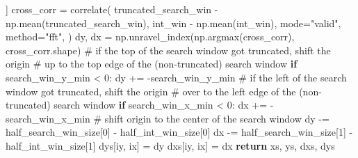 \documentclass[
  english,
  letterpaper,
  numbers=noendperiod,
  DIV=13]{scrreprt}
\newenvironment{Shaded}{\begin{snugshade}}{\end{snugshade}}
\newcommand{\CommentTok}[1]{\textcolor[rgb]{0.37,0.37,0.37}{#1}}
\newcommand{\ControlFlowTok}[1]{\textcolor[rgb]{0.00,0.23,0.31}{\textbf{#1}}}
\newcommand{\DecValTok}[1]{\textcolor[rgb]{0.68,0.00,0.00}{#1}}
\newcommand{\NormalTok}[1]{\textcolor[rgb]{0.00,0.23,0.31}{#1}}
\newcommand{\OperatorTok}[1]{\textcolor[rgb]{0.37,0.37,0.37}{#1}}
\newcommand{\StringTok}[1]{\textcolor[rgb]{0.13,0.47,0.30}{#1}}
\begin{document}
\begin{Shaded}
\begin{Highlighting}[]
\NormalTok{            ]}
\NormalTok{            cross\_corr }\OperatorTok{=}\NormalTok{ correlate(}
\NormalTok{                truncated\_search\_win }\OperatorTok{{-}}\NormalTok{ np.mean(truncated\_search\_win),}
\NormalTok{                int\_win }\OperatorTok{{-}}\NormalTok{ np.mean(int\_win),}
\NormalTok{                mode}\OperatorTok{=}\StringTok{"valid"}\NormalTok{,}
\NormalTok{                method}\OperatorTok{=}\StringTok{"fft"}\NormalTok{,}
\NormalTok{            )}
\NormalTok{            dy, dx }\OperatorTok{=}\NormalTok{ np.unravel\_index(np.argmax(cross\_corr), cross\_corr.shape)}
            \CommentTok{\# if the top of the search window got truncated, shift the origin}
            \CommentTok{\# up to the top edge of the (non{-}truncated) search window}
            \ControlFlowTok{if}\NormalTok{ search\_win\_y\_min }\OperatorTok{\textless{}} \DecValTok{0}\NormalTok{:}
\NormalTok{                dy }\OperatorTok{+=} \OperatorTok{{-}}\NormalTok{search\_win\_y\_min}
            \CommentTok{\# if the left of the search window got truncated, shift the origin}
            \CommentTok{\# over to the left edge of the (non{-}truncated) search window}
            \ControlFlowTok{if}\NormalTok{ search\_win\_x\_min }\OperatorTok{\textless{}} \DecValTok{0}\NormalTok{:}
\NormalTok{                dx }\OperatorTok{+=} \OperatorTok{{-}}\NormalTok{search\_win\_x\_min}
            \CommentTok{\# shift origin to the center of the search window}
\NormalTok{            dy }\OperatorTok{{-}=}\NormalTok{ half\_search\_win\_size[}\DecValTok{0}\NormalTok{] }\OperatorTok{{-}}\NormalTok{ half\_int\_win\_size[}\DecValTok{0}\NormalTok{]}
\NormalTok{            dx }\OperatorTok{{-}=}\NormalTok{ half\_search\_win\_size[}\DecValTok{1}\NormalTok{] }\OperatorTok{{-}}\NormalTok{ half\_int\_win\_size[}\DecValTok{1}\NormalTok{]}
\NormalTok{            dys[iy, ix] }\OperatorTok{=}\NormalTok{ dy}
\NormalTok{            dxs[iy, ix] }\OperatorTok{=}\NormalTok{ dx}
    \ControlFlowTok{return}\NormalTok{ xs, ys, dxs, dys}
\end{Highlighting}
\end{Shaded}
\end{document}
